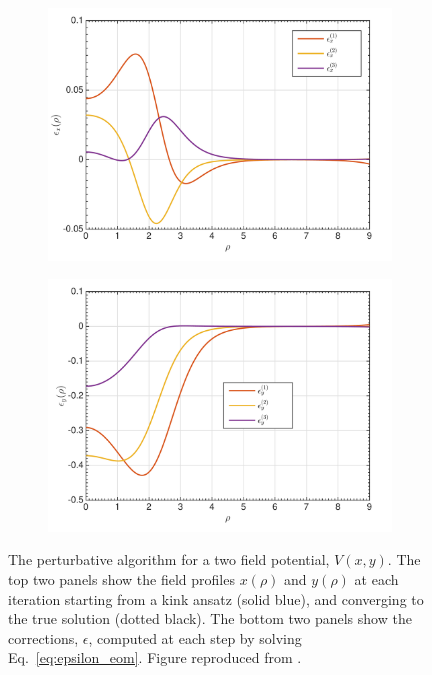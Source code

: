 \documentclass[final,3p,11pt,pdflatex]{elsarticle}
\renewcommand{\refeq}[1]{Eq.~\ref{#1}}
\begin{document}
\begin{figure}[h]
\begin{subfigure}[b]{0.48\textwidth}
        \includegraphics[width=\textwidth]{figures/perturbative_eps_x.pdf}
    \end{subfigure}
    \quad
    \begin{subfigure}[b]{0.48\textwidth}
        \centering
        \includegraphics[width=\textwidth]{figures/perturbative_eps_y.pdf}
    \end{subfigure}
    \caption[]{%
      The perturbative algorithm for a two field potential, $V(x, y)$. The top
      two panels show the field profiles $x(\rho)$ and $y(\rho)$ at each
      iteration starting from a kink ansatz (solid blue), and converging to
      the true solution (dotted black). The bottom two panels show the
      corrections, $\epsilon$, computed at each step by solving
      \refeq{eq:epsilon_eom}. Figure reproduced from \cite{Akula:2016gpl}.}
    \label{fig:perturbative_method}
\end{figure}
\end{document}
